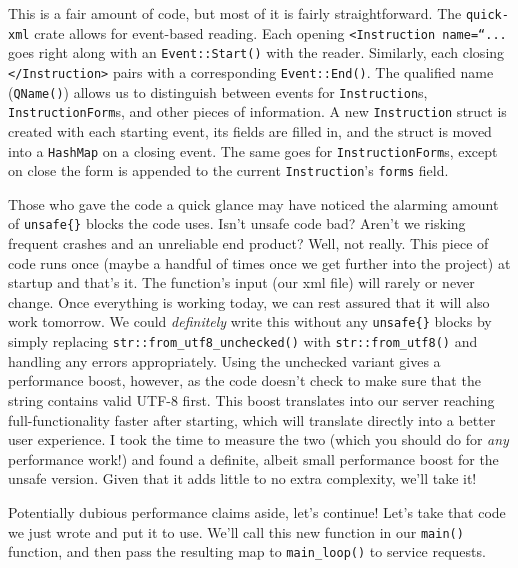 This is a fair amount of code, but most of it is fairly straightforward. The \texttt{quick-xml} crate allows for event-based reading. Each opening \texttt{<Instruction name=``...} goes right along with an \texttt{Event::Start()} with the reader. Similarly, each closing \texttt{</Instruction>} pairs with a corresponding \texttt{Event::End()}. The qualified name (\texttt{QName()}) allows us to distinguish between events for \texttt{Instruction}s, \texttt{InstructionForm}s, and other pieces of information. A new \texttt{Instruction} struct is created with each starting event, its fields are filled in, and the struct is moved into a \texttt{HashMap} on a closing event. The same goes for \texttt{InstructionForm}s, except on close the form is appended to the current \texttt{Instruction}'s \texttt{forms} field.

Those who gave the code a quick glance may have noticed the alarming amount of \texttt{unsafe\{\}} blocks the code uses. Isn't unsafe code bad? Aren't we risking frequent crashes and an unreliable end product? Well, not really. This piece of code runs once (maybe a handful of times once we get further into the project) at startup and that's it. The function's input (our xml file) will rarely or never change. Once everything is working today, we can rest assured that it will also work tomorrow. We could \textit{definitely} write this without any \texttt{unsafe\{\}} blocks by simply replacing  \texttt{str::from\_utf8\_unchecked()} with \texttt{str::from\_utf8()} and handling any errors appropriately. Using the unchecked variant gives a performance boost, however, as the code doesn't check to make sure that the string contains valid UTF-8 first. This boost translates into our server reaching full-functionality faster after starting, which will translate directly into a better user experience. I took the time to measure the two (which you should do for \textit{any} performance work!) and found a definite, albeit small performance boost for the unsafe version. Given that it adds little to no extra complexity, we'll take it!

Potentially dubious performance claims aside, let's continue! Let's take that code we just wrote and put it to use. We'll call this new function in our \texttt{main()} function, and then pass the resulting map to \texttt{main\_loop()} to service requests.

